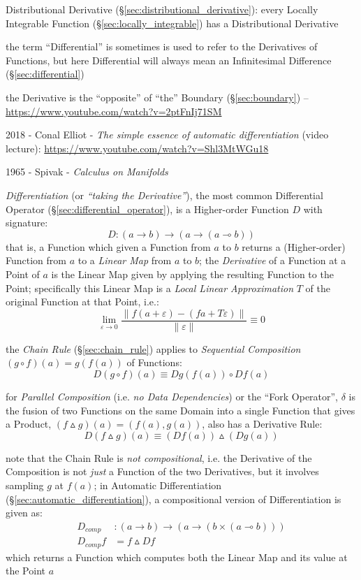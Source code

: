 {\fist Distributional Derivative (\S\ref{sec:distributional_derivative}): every
Locally Integrable Function (\S\ref{sec:locally_integrable}) has a
Distributional Derivative

the term ``Differential'' is sometimes is used to
refer to the Derivatives of Functions, but here Differential will always mean an
Infinitesimal Difference (\S\ref{sec:differential})

the Derivative is the ``opposite'' of ``the'' Boundary (\S\ref{sec:boundary})
--\url{https://www.youtube.com/watch?v=2ptFnIj71SM}

2018 - Conal Elliot - \emph{The simple essence of automatic differentiation}
(video lecture): \url{https://www.youtube.com/watch?v=Shl3MtWGu18}

1965 - Spivak - \emph{Calculus on Manifolds}

\emph{Differentiation} (or \emph{``taking the Derivative''}), the most common
Differential Operator (\S\ref{sec:differential_operator}), is a Higher-order
Function $D$ with signature:
\[
  D : (a \rightarrow b) \rightarrow (a \rightarrow (a \multimap b))
\]
that is, a Function which given a Function from $a$ to $b$ returns a
(Higher-order) Function from $a$ to a \emph{Linear Map} from $a$ to $b$; the
\emph{Derivative} of a Function at a Point of $a$ is the Linear Map given by
applying the resulting Function to the Point; specifically this Linear Map is a
\emph{Local Linear Approximation} $T$ of the original Function at that Point,
i.e.:
\[
  \lim_{\varepsilon \rightarrow 0}
    \frac{\|f (a + \varepsilon) - (f a + T \varepsilon)\|}{\|\varepsilon\|}
    \equiv 0
\]

the \emph{Chain Rule} (\S\ref{sec:chain_rule}) applies to \emph{Sequential
  Composition} $(g \circ f)(a) = g (f (a))$ of Functions:
\[
  D(g \circ f) (a) \equiv D g (f(a)) \circ D f (a)
\]

for \emph{Parallel Composition} (i.e. \emph{no Data Dependencies}) or the ``Fork
Operator'', $\delta$ is the fusion of two Functions on the same Domain into a
single Function that gives a Product, $(f \vartriangle g)(a) = (f(a), g(a))$,
also has a Derivative Rule:
\[
  D(f \vartriangle g)(a) \equiv (D f (a)) \vartriangle (D g (a))
\]

note that the Chain Rule is \emph{not compositional}, i.e. the Derivative of the
Composition is not \emph{just} a Function of the two Derivatives, but it
involves sampling $g$ at $f(a)$; in Automatic Differentiation
(\S\ref{sec:automatic_differentiation}), a compositional version of
Differentiation is given as:
\begin{align*}
  D_{comp}   & : (a \rightarrow b)
    \rightarrow (a \rightarrow (b \times (a \multimap b))) \\
  D_{comp} f & = f \vartriangle D f
\end{align*}
which returns a Function which computes both the Linear Map and its value at the
Point $a$

}
